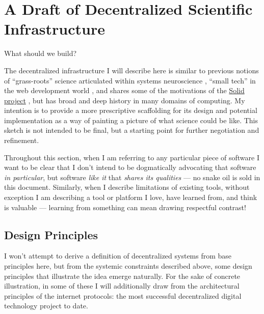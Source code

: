 \documentclass[10pt]{article}
\begin{document}
\hypertarget{a-draft-of-decentralized-scientific-infrastructure}{%
\section{A Draft of Decentralized Scientific
Infrastructure}\label{a-draft-of-decentralized-scientific-infrastructure}}


\begin{multicols}{2}
 What should we build?

The decentralized infrastructure I will describe here is similar to
previous notions of ``grass-roots'' science articulated within systems
neuroscience \cite{mainenBetterWayCrack2016} , ``small tech'' in
the web development world \cite{balkanSmallTechnologyFoundation} , and shares some of the motivations of the
\href{https://solidproject.org/}{Solid project} \cite{sambraSolidPlatformDecentralized2016} , but has broad and deep
history in many domains of computing. My intention is to provide a more
prescriptive scaffolding for its design and potential implementation as
a way of painting a picture of what science could be like. This sketch
is not intended to be final, but a starting point for further
negotiation and refinement.

Throughout this section, when I am referring to any particular piece of
software I want to be clear that I don't intend to be dogmatically
advocating that software \emph{in particular}, but software \emph{like
it} that \emph{shares its qualities} --- no snake oil is sold in this
document. Similarly, when I describe limitations of existing tools,
without exception I am describing a tool or platform I love, have
learned from, and think is valuable --- learning from something can mean
drawing respectful contrast!

\hypertarget{design-principles}{%
\subsection{Design Principles}\label{design-principles}}

I won't attempt to derive a definition of decentralized systems from
base principles here, but from the systemic constraints described above,
some design principles that illustrate the idea emerge naturally. For
the sake of concrete illustration, in some of these I will additionally
draw from the architectural principles of the internet protocols: the
most successful decentralized digital technology project to date.


\end{multicols}
\end{document}
